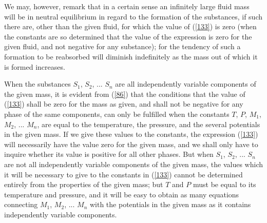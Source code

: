 \documentclass[12pt]{article}
\begin{document}
We may, however, remark that in a certain sense an infinitely large fluid mass will be in neutral equilibrium in regard to the formation of the substances, if such there are, other than the given fluid, for which the value of (\ref{133}) is zero (when the constants are so determined that the value of the expression is zero for the given fluid, and not negative for any substance); for the tendency of such a formation to be reabsorbed will diminish indefinitely as the mass out of which it is formed increases.


When the substances $S_1$, $S_2$, ... $S_n$ are all independently variable components of the given mass, it is evident from (\ref{86}) that the conditions that the value of (\ref{133}) shall be zero for the mass as given, and shall not be negative for any phase of the same components, can only be fulfilled when the constants $T$, $P$, $M_1$, $M_2$, ... $M_n$, are equal to the temperature, the pressure, and the several potentials in the given mass. If we give these values to the constants, the expression (\ref{133}) will necessarily have the value zero for the given mass, and we shall only have to inquire whether its value is positive for all other phases. But when $S_1$, $S_2$, ... $S_n$ are not all independently variable components of the given mass, the values which it will be necessary to give to the constants in (\ref{133}) cannot be determined entirely from the properties of the given mass; but $T$ and $P$ must be equal to its temperature and pressure, and it will be easy to obtain as many equations connecting $M_1$, $M_2$, ... $M_n$ with the potentials in the given mass as it contains independently variable components.
\end{document}

